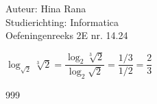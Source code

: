 \documentclass[a4paper]{article}
\begin{document}
\noindent \large Auteur: Hina Rana \\
\noindent \large Studierichting: Informatica\\
\noindent \large Oefeningenreeks 2E nr. 14.24\\

\medskip

\normalsize
$\log_{\sqrt{2}} \sqrt[3]{2} = \dfrac{\log_2 \sqrt[3]{2}}{\log_2 \sqrt{2}} = \dfrac{1/3}{1/2} = \dfrac{2}{3}$



\begin{thebibliography}{999}
\end{thebibliography}
\end{document}
